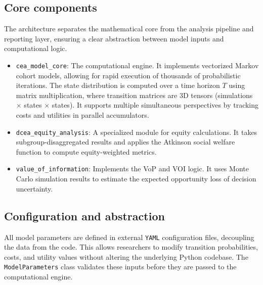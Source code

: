 \documentclass[article]{jss}
\newcommand{\code}[1]{\texttt{#1}}
\begin{document}
\subsection{Core components}
The architecture separates the mathematical core from the analysis pipeline and reporting layer, ensuring a clear abstraction between model inputs and computational logic.
\begin{itemize}
  \item \code{cea\_model\_core}: The computational engine. It implements vectorized Markov cohort models, allowing for rapid execution of thousands of probabilistic iterations. The state distribution is computed over a time horizon $T$ using matrix multiplication, where transition matrices are 3D tensors (simulations $\times$ states $\times$ states). It supports multiple simultaneous perspectives by tracking costs and utilities in parallel accumulators.
  \item \code{dcea\_equity\_analysis}: A specialized module for equity calculations. It takes subgroup-disaggregated results and applies the Atkinson social welfare function to compute equity-weighted metrics.
  \item \code{value\_of\_information}: Implements the VoP and VOI logic. It uses Monte Carlo simulation results to estimate the expected opportunity loss of decision uncertainty.
\end{itemize}

\subsection{Configuration and abstraction}
All model parameters are defined in external \code{YAML} configuration files, decoupling the data from the code.
This allows researchers to modify transition probabilities, costs, and utility values without altering the underlying Python codebase.
The \code{ModelParameters} class validates these inputs before they are passed to the computational engine.
\end{document}
